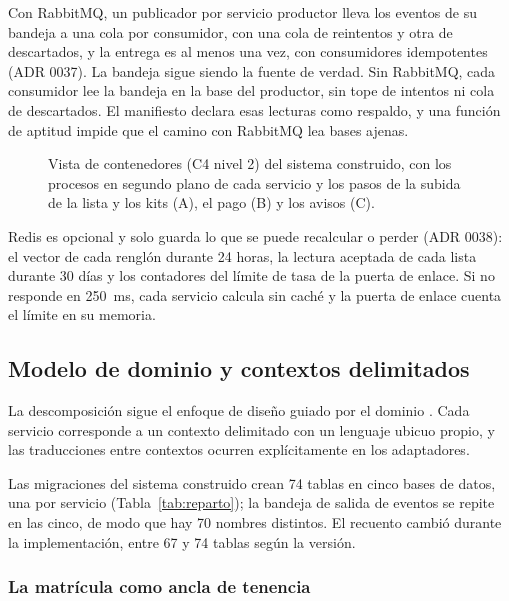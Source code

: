 Con RabbitMQ, un publicador por servicio productor lleva los eventos de su bandeja a una cola
por consumidor, con una cola de reintentos y otra de descartados, y la entrega es al menos una
vez, con consumidores idempotentes (ADR 0037). La bandeja sigue siendo la fuente de verdad. Sin
RabbitMQ, cada consumidor lee la bandeja en la base del productor, sin tope de intentos ni cola
de descartados. El manifiesto declara esas lecturas como respaldo, y una función de aptitud
impide que el camino con RabbitMQ lea bases ajenas.



\begin{figure}[htbp]
\centering

\caption{Vista de contenedores (C4 nivel 2) del sistema construido, con los procesos en
segundo plano de cada servicio y los pasos de la subida de la lista y los kits (A), el pago (B)
y los avisos (C).}
\label{fig:c4-contenedores}
\end{figure}

Redis es opcional y solo guarda lo que se puede recalcular o perder (ADR 0038): el vector de cada
renglón durante 24 horas, la lectura aceptada de cada lista durante 30 días y los contadores del
límite de tasa de la puerta de enlace. Si no responde en 250~ms, cada servicio calcula sin caché
y la puerta de enlace cuenta el límite en su memoria.

\subsection{Modelo de dominio y contextos delimitados}
\label{sec:dominio}

La descomposición sigue el enfoque de diseño guiado por el dominio \citep{evans_domain-driven_2004}.
Cada servicio corresponde a un contexto delimitado con un lenguaje ubicuo propio, y las
traducciones entre contextos ocurren explícitamente en los adaptadores.

Las migraciones del sistema construido crean 74 tablas en cinco bases de datos, una por
servicio (Tabla~\ref{tab:reparto}); la bandeja de salida de eventos se repite en las cinco,
de modo que hay 70 nombres distintos. El recuento cambió durante la implementación, entre
67 y 74 tablas según la versión.



\subsubsection{La matrícula como ancla de tenencia}

